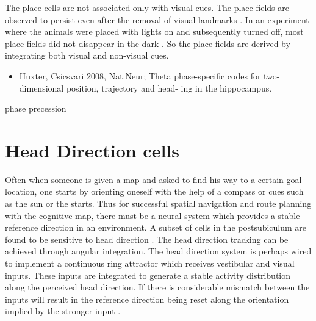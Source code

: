 The place cells are not associated only with visual cues. The place fields are observed to persist even after the removal of visual landmarks \cite{Kubie1987}. In an experiment where the animals were placed with lights on and subsequently turned off, most place fields did not disappear in the dark \cite{Muller2008}. So the place fields are derived by integrating both visual and non-visual cues. \\ 

\begin{itemize}
Mehta, Barenes and Mc Naughton1997 - pfs shift backwards after repeated traversals along the same trajectory 
Place cell firing is also correlated with speed, direction, and turning angle  and stage of the task \\
Markus 1995 - pfs are task sensitive, pfs rapidly changed when the task changed to random foraging and search for food at the corners of a diamond\\

extra hippocampal cells have also been reported, but show different characteristics the hippocampal place cells\\
Wilson MccNaughton 1993 - place cells recorded with tetrode shower fewer subfields\\

\item Huxter, Csicsvari 2008, Nat.Neur; Theta phase-specific
codes for two-dimensional position, trajectory and head-
ing in the hippocampus.

\end{itemize}
 phase precession
 
\section{Head Direction cells}
Often when someone is given a map and asked to find his way to a certain goal location, one starts by orienting oneself with the help of a compass or cues such as the sun or the starts. Thus for successful spatial navigation and route planning with the cognitive map, there must be a neural system which provides a stable reference direction in an environment. A subset of cells in the postsubiculum  are found to be sensitive to head direction \cite{Taube1990}. The head direction tracking can be achieved through angular integration. The head direction system is perhaps wired to implement a continuous ring attractor which receives vestibular and visual inputs. These inputs are integrated to generate a stable activity distribution along the perceived head direction. If there is considerable mismatch between the inputs will result in the reference direction being reset along the orientation implied by the stronger input \cite{Valerio2012}.

